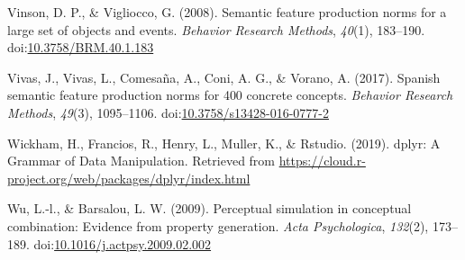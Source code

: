 \documentclass[man]{apa6}
\begin{document}
\leavevmode\hypertarget{ref-Vinson2008}{}%
Vinson, D. P., \& Vigliocco, G. (2008). Semantic feature production norms for a large set of objects and events. \emph{Behavior Research Methods}, \emph{40}(1), 183--190. doi:\href{https://doi.org/10.3758/BRM.40.1.183}{10.3758/BRM.40.1.183}

\leavevmode\hypertarget{ref-Vivas2017}{}%
Vivas, J., Vivas, L., Comesaña, A., Coni, A. G., \& Vorano, A. (2017). Spanish semantic feature production norms for 400 concrete concepts. \emph{Behavior Research Methods}, \emph{49}(3), 1095--1106. doi:\href{https://doi.org/10.3758/s13428-016-0777-2}{10.3758/s13428-016-0777-2}

\leavevmode\hypertarget{ref-Wickham2019}{}%
Wickham, H., Francios, R., Henry, L., Muller, K., \& Rstudio. (2019). dplyr: A Grammar of Data Manipulation. Retrieved from \url{https://cloud.r-project.org/web/packages/dplyr/index.html}

\leavevmode\hypertarget{ref-Wu2009}{}%
Wu, L.-l., \& Barsalou, L. W. (2009). Perceptual simulation in conceptual combination: Evidence from property generation. \emph{Acta Psychologica}, \emph{132}(2), 173--189. doi:\href{https://doi.org/10.1016/j.actpsy.2009.02.002}{10.1016/j.actpsy.2009.02.002}

\endgroup
\end{document}
